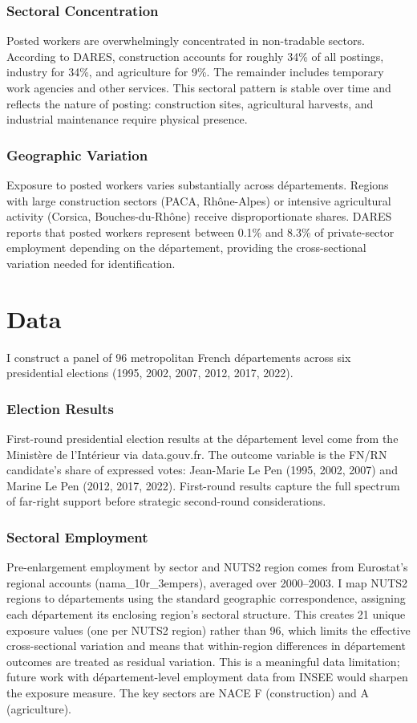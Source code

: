 \documentclass[12pt]{article}
\begin{document}
\subsubsection*{Sectoral Concentration} Posted workers are overwhelmingly concentrated in non-tradable sectors. According to DARES, construction accounts for roughly 34\% of all postings, industry for 34\%, and agriculture for 9\%. The remainder includes temporary work agencies and other services. This sectoral pattern is stable over time and reflects the nature of posting: construction sites, agricultural harvests, and industrial maintenance require physical presence.

\subsubsection*{Geographic Variation} Exposure to posted workers varies substantially across d\'epartements. Regions with large construction sectors (PACA, Rh\^one-Alpes) or intensive agricultural activity (Corsica, Bouches-du-Rh\^one) receive disproportionate shares. DARES reports that posted workers represent between 0.1\% and 8.3\% of private-sector employment depending on the d\'epartement, providing the cross-sectional variation needed for identification.

\section{Data}

I construct a panel of 96 metropolitan French d\'epartements across six presidential elections (1995, 2002, 2007, 2012, 2017, 2022).

\subsubsection*{Election Results} First-round presidential election results at the d\'epartement level come from the Minist\`ere de l'Int\'erieur via data.gouv.fr. The outcome variable is the FN/RN candidate's share of expressed votes: Jean-Marie Le Pen (1995, 2002, 2007) and Marine Le Pen (2012, 2017, 2022). First-round results capture the full spectrum of far-right support before strategic second-round considerations.

\subsubsection*{Sectoral Employment} Pre-enlargement employment by sector and NUTS2 region comes from Eurostat's regional accounts (nama\_10r\_3empers), averaged over 2000--2003. I map NUTS2 regions to d\'epartements using the standard geographic correspondence, assigning each d\'epartement its enclosing region's sectoral structure. This creates 21 unique exposure values (one per NUTS2 region) rather than 96, which limits the effective cross-sectional variation and means that within-region differences in d\'epartement outcomes are treated as residual variation. This is a meaningful data limitation; future work with d\'epartement-level employment data from INSEE would sharpen the exposure measure. The key sectors are NACE F (construction) and A (agriculture).
\end{document}
